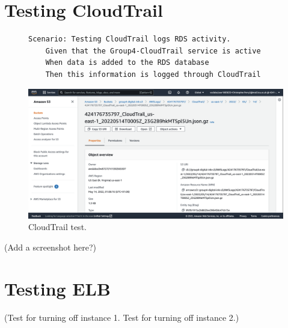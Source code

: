 \clearpage
\section{Testing CloudTrail}\label{sec:testing-cloudtrail}
\begin{figure}[!htbp]
    \centering
    \begin{verbatim}
Scenario: Testing CloudTrail logs RDS activity.
    Given that the Group4-CloudTrail service is active
    When data is added to the RDS database
    Then this information is logged through CloudTrail
    \end{verbatim}
    \label{fig:cloudtrail-test}
\end{figure}

\begin{figure}[!htbp]
    \centering
    \includegraphics[width=\textwidth]{resources/cloudtrail/cloudtrail-test}
    \caption{CloudTrail test.}
    \label{fig:cloudtrail-test-photo}
\end{figure}

(Add a screenshot here?)

\clearpage
\section{Testing ELB}\label{sec:testing-elb}
(Test for turning off instance 1. Test for turning off instance 2.)